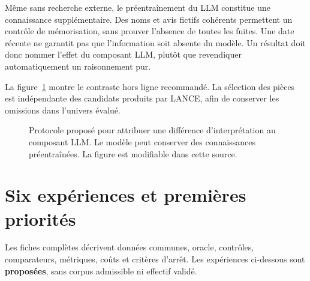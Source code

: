 \documentclass[11pt,a4paper]{article}
\begin{document}
Même sans recherche externe, le préentraînement du LLM constitue une
connaissance supplémentaire. Des noms et avis fictifs cohérents permettent un
contrôle de mémorisation, sans prouver l'absence de toutes les fuites. Une date
récente ne garantit pas que l'information soit absente du modèle. Un résultat
doit donc nommer l'effet du composant LLM, plutôt que revendiquer automatiquement
un raisonnement pur.

La figure~\ref{fig:attribution} montre le contraste hors ligne recommandé.
La sélection des pièces est indépendante des candidats produits par LANCE,
afin de conserver les omissions dans l'univers évalué.
\begin{figure}[htbp]\centering
{}
\caption{Protocole proposé pour attribuer une différence d'interprétation
au composant LLM. Le modèle peut conserver des connaissances préentraînées.
La figure est modifiable dans cette source.}\label{fig:attribution}
\end{figure}

\section{Six expériences et premières priorités}
Les fiches complètes \cite{experiences} décrivent données communes, oracle,
contrôles, comparateurs, métriques, coûts et critères d'arrêt. Les expériences
ci-dessous sont \textbf{proposées}, sans corpus admissible ni effectif validé.
\end{document}
